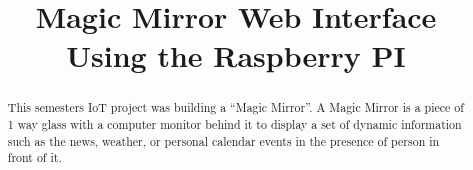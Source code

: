 \documentclass[conference]{IEEEtran}
\begin{document}
%
\title{Magic Mirror Web Interface\\ Using the Raspberry PI}

\author{
\and
{}
\and
{}
}

\maketitle

\begin{abstract}
This semesters IoT project was building a “Magic Mirror”. 
A Magic Mirror is a piece of 1 way glass with a computer monitor behind it to display a set of dynamic information such as the news, weather, or personal calendar events in the presence of person in front of it.
\end{abstract}
\end{document}
